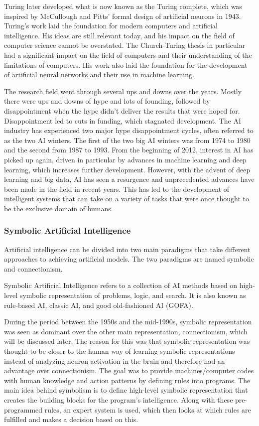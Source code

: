 Turing later developed what is now known as the Turing complete, which was inspired by McCullough and Pitts' formal design of artificial neurons in 1943. Turing's work laid the foundation for modern computers and artificial intelligence. His ideas are still relevant today, and his impact on the field of computer science cannot be overstated. The Church-Turing thesis in particular had a significant impact on the field of computers and their understanding of the limitations of computers. His work also laid the foundation for the development of artificial neural networks and their use in machine learning.

The research field went through several ups and downs over the years. Mostly there were ups and downs of hype and lots of founding, followed by disappointment when the hype didn't deliver the results that were hoped for. Disappointment led to cuts in funding, which stagnated development. The AI industry has experienced two major hype disappointment cycles, often referred to as the two AI winters. The first of the two big AI winters was from 1974 to 1980 and the second from 1987 to 1993. From the beginning of 2012, interest in AI has picked up again, driven in particular by advances in machine learning and deep learning, which increases further development. However, with the advent of deep learning and big data, AI has seen a resurgence and unprecedented advances have been made in the field in recent years. This has led to the development of intelligent systems that can take on a variety of tasks that were once thought to be the exclusive domain of humans. 


\subsubsection{Symbolic Artificial Intelligence}
Artificial intelligence can be divided into two main paradigms that take different approaches to achieving artificial models. The two paradigms are named symbolic and connectionism.

Symbolic Artificial Intelligence refers to a collection of AI methods based on high-level symbolic representation of problems, logic, and search. It is also known as rule-based AI, classic AI, and good old-fashioned AI (GOFA). 

During the period between the 1950s and the mid-1990s, symbolic representation was seen as dominant over the other main representation, connectionism, which will be discussed later. The reason for this was that symbolic representation was thought to be closer to the human way of learning symbolic representations instead of analyzing neuron activation in the brain and therefore had an advantage over connectionism.
The goal was to provide machines/computer codes with human knowledge and action patterns by defining rules into programs. The main idea behind symbolism is to define high-level symbolic representation that creates the building blocks for the program's intelligence. Along with these pre-programmed rules, an expert system is used, which then looks at which rules are fulfilled and makes a decision based on this.

